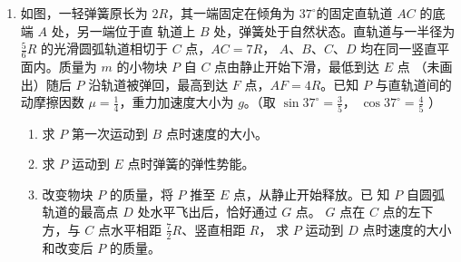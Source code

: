 \begin{enumerate}
\newpage
\item 
{}
如图，一轻弹簧原长为 $ 2R $，其一端固定在倾角为 $ 37 ^{ \circ } $的固定直轨道 $ AC $ 的底端 $ A $ 处，另一端位于直
轨道上 $ B $ 处，弹簧处于自然状态。直轨道与一半径为 $ \frac{ 5 }{ 6 } R $ 的光滑圆弧轨道相切于 $ C $ 点，$ AC=7R $，
$ A $、$ B $、$ C $、$ D $ 均在同一竖直平面内。质量为 $ m $ 的小物块 $ P $ 自 $ C $ 点由静止开始下滑，最低到达 $ E $ 点
（未画出）随后 $ P $ 沿轨道被弹回，最高到达 $ F $ 点，$ AF=4R $。已知 $ P $ 与直轨道间的动摩擦因数
$ \mu= \frac{ 1 }{ 4 } $，重力加速度大小为 $ g $。（取 $ \sin 37 ^{ \circ } = \frac{ 3 }{ 5 } $， $ \cos 37 ^{ \circ } = \frac{ 4 }{ 5 } $ ）
\begin{enumerate}
\renewcommand{\labelenumi}{\arabic{enumi}.}
\item
求 $ P $ 第一次运动到 $ B $ 点时速度的大小。

\item 
求 $ P $ 运动到 $ E $ 点时弹簧的弹性势能。



\item 
改变物块 $ P $ 的质量，将 $ P $ 推至 $ E $ 点，从静止开始释放。已
知 $ P $ 自圆弧轨道的最高点 $ D $ 处水平飞出后，恰好通过 $ G $ 点。
$ G $ 点在 $ C $ 点的左下方，与 $ C $ 点水平相距 $ \frac{ 7 }{ 2 } R $、竖直相距 $ R $，
求 $ P $ 运动到 $ D $ 点时速度的大小和改变后 $ P $ 的质量。




\end{enumerate}
\begin{figure}[h!]
\flushright

\end{figure}

\end{enumerate}
